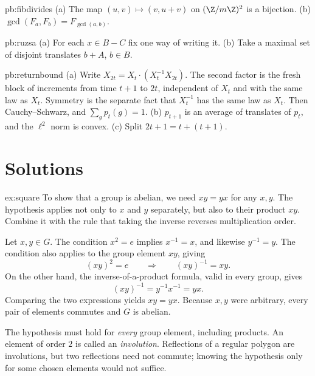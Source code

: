 \begin{hint}{pb:fibdivides}
(a) The map $(u,v)\mapsto(v,u+v)$ on $(\Z/m\Z)^2$ is a bijection. (b) $\gcd(F_a,F_b)=F_{\gcd(a,b)}$.
\end{hint}

\begin{hint}{pb:ruzsa}
(a) For each $x\in B-C$ fix one way of writing it. (b) Take a maximal set of disjoint translates $b+A$, $b\in B$.
\end{hint}

\begin{hint}{pb:returnbound}
(a) Write $X_{2t}=X_t\cdot(X_t^{-1}X_{2t})$. The second factor is the fresh block of increments from time $t+1$ to $2t$, independent of $X_t$ and with the same law as $X_t$. Symmetry is the separate fact that $X_t^{-1}$ has the same law as $X_t$. Then Cauchy--Schwarz, and $\sum_gp_t(g)=1$. (b) $p_{t+1}$ is
an average of translates of $p_t$, and the $\ell^2$ norm is convex. (c) Split $2t+1=t+(t+1)$.
\end{hint}

\section{Solutions}

\begin{solution}{ex:square}
\idea To show that a group is abelian, we need $xy=yx$ for any $x,y$. The hypothesis applies not only to $x$ and $y$ separately, but also to their product $xy$. Combine it with the rule that taking the inverse reverses multiplication order.

\writeup Let $x,y\in G$. The condition $x^2=e$ implies $x^{-1}=x$, and likewise $y^{-1}=y$. The condition also applies to the group element $xy$, giving
\[
(xy)^2=e\qquad\Longrightarrow\qquad(xy)^{-1}=xy.
\]
On the other hand, the inverse-of-a-product formula, valid in every group, gives
\[
(xy)^{-1}=y^{-1}x^{-1}=yx.
\]
Comparing the two expressions yields $xy=yx$. Because $x,y$ were arbitrary, every pair of elements commutes and $G$ is abelian.

The hypothesis must hold for \emph{every} group element, including products. An element of order $2$ is called an \emph{involution}. Reflections of a regular polygon are involutions, but two reflections need not commute; knowing the hypothesis only for some chosen elements would not suffice.
\end{solution}

